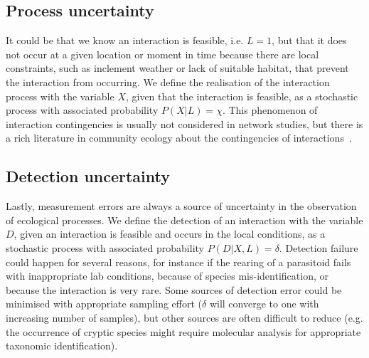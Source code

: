 \documentclass[12pt]{article}
\begin{document}
    \subsection*{Process uncertainty} 

    It could be that we know an interaction is feasible, i.e. $L=1$, but that it does not occur at a given location or moment in time because there are local constraints, such as inclement weather or lack of suitable habitat, that prevent the interaction from occurring. We define the realisation of the interaction process with the variable $X$, given that the interaction is feasible, as a stochastic process with associated probability $P(X|L)=\chi$. This phenomenon of interaction contingencies is usually not considered in network studies, but there is a rich literature in community ecology about the contingencies of interactions~\citep{}. 

    \subsection*{Detection uncertainty} 

    Lastly, measurement errors are always a source of uncertainty in the observation of ecological processes. We define the detection of an interaction with the variable $D$, given an interaction is feasible and occurs in the local conditions, as a stochastic process with associated probability $P(D|X,L)=\delta$. Detection failure could happen for several reasons, for instance if the rearing of a parasitoid fails with inappropriate lab conditions, because of species mis-identification, or because the interaction is very rare. Some sources of detection error could be minimised with appropriate sampling effort ($\delta$ will converge to one with increasing number of samples), but other sources are often difficult to reduce (e.g. the occurrence of cryptic species might require molecular analysis for appropriate taxonomic identification).


\end{document}
